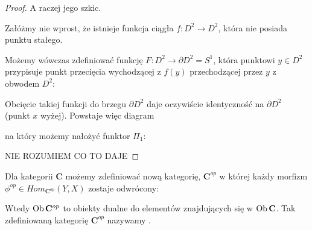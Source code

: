 \begin{proof}
  A raczej jego szkic.

  Załóżmy nie wprost, że istnieje funkcja ciągła $f:D^2\to D^2$, która nie posiada punktu stałego. 

  Możemy wówczas zdefiniować funkcję $F:D^2\to\partial D^2=S^1$, która punktowi $y\in D^2$ przypisuje punkt przecięcia wychodzącej z $f(y)$ przechodzącej przez $y$ z obwodem $D^2$:
  \begin{center}\end{center}
  Obcięcie takiej funkcji do brzegu $\partial D^2$ daje oczywiście identyczność na $\partial D^2$ (punkt $x$ wyżej). Powstaje więc diagram
  \begin{center}\end{center}
  na który możemy nałożyć funktor $\Pi_1$:
  \begin{center}\end{center}
  {\large\color{red}NIE ROZUMIEM CO TO DAJE}
\end{proof}

\begin{definition}
  Dla kategorii $\mathbf{C}$ możemy zdefiniować nową kategorię, $\mathbf{C}^{op}$ w której każdy morfizm $\phi^{op}\in Hom_{\mathbf{C}^{op}}(Y, X)$ zostaje odwrócony:
  \begin{center}\end{center}
  Wtedy $\operatorname{Ob}\mathbf{C}^{op}$ to obiekty dualne do elementów znajdujących się w $\operatorname{Ob}\mathbf{C}$. Tak zdefiniowaną kategorię $\mathbf{C}^{op}$ nazywamy .
\end{definition}

